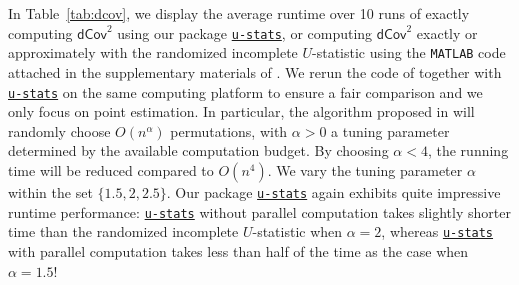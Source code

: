 \documentclass[letterpaper,11pt]{article}
\newcommand{\Lin}[1]{{\color{purple}{Lin: #1}}}
\newcommand{\Zhang}[1]{{\color{blue}{Zhang: #1}}}
\newcommand{\libref}[2]{\href{#2}{\texttt{#1}}}
\newcommand{\uset}{\calU}
\newcommand{\usetnm}[2]{\uset\left(#1,#2\right)}
\def\package{\libref{u-stats}{https://github.com/zrq1706/U-Statistics-Python}}
\begin{document}
\begin{bibunit}[plainnat]
In Table~\ref{tab:dcov}, we display the average runtime over 10 runs of exactly computing $\mathsf{dCov}^2$ using our package \package{}, or computing $\mathsf{dCov}^2$ exactly or approximately with the randomized incomplete $U$-statistic using the \texttt{MATLAB} code attached in the supplementary materials of \citet{shao2025u}. We rerun the code of \citet{shao2025u} together with \package{} on the same computing platform to ensure a fair comparison and we only focus on point estimation. In particular, the algorithm proposed in \citet{shao2025u} will randomly choose $O (n^\alpha)$ %
permutations, with $\alpha > 0$ a tuning parameter determined by the available computation budget. By choosing $\alpha < 4$, the running time will be reduced compared to $O (n^{4})$. We vary the tuning parameter $\alpha$ within the set $\{1.5, 2, 2.5\}$. Our package \package{} again exhibits quite impressive runtime performance: \package{} without parallel computation takes slightly shorter time than the randomized incomplete $U$-statistic when $\alpha = 2$, whereas \package{} with parallel computation takes less than half of the time as the case when $\alpha = 1.5$!






\end{bibunit}
\end{document}
